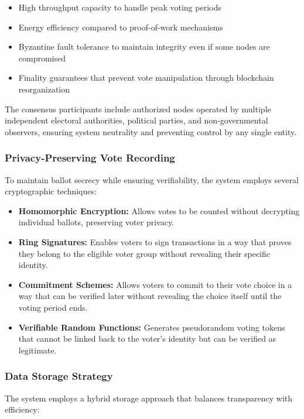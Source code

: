 \documentclass[conference]{IEEEtran}
\begin{document}
\begin{itemize}
    \item High throughput capacity to handle peak voting periods
    \item Energy efficiency compared to proof-of-work mechanisms
    \item Byzantine fault tolerance to maintain integrity even if some nodes are compromised
    \item Finality guarantees that prevent vote manipulation through blockchain reorganization
\end{itemize}

The consensus participants include authorized nodes operated by multiple independent electoral authorities, political parties, and non-governmental observers, ensuring system neutrality and preventing control by any single entity.

\subsubsection{Privacy-Preserving Vote Recording}
To maintain ballot secrecy while ensuring verifiability, the system employs several cryptographic techniques:

\begin{itemize}
    \item \textbf{Homomorphic Encryption:} Allows votes to be counted without decrypting individual ballots, preserving voter privacy.
    
    \item \textbf{Ring Signatures:} Enables voters to sign transactions in a way that proves they belong to the eligible voter group without revealing their specific identity.
    
    \item \textbf{Commitment Schemes:} Allows voters to commit to their vote choice in a way that can be verified later without revealing the choice itself until the voting period ends.
    
    \item \textbf{Verifiable Random Functions:} Generates pseudorandom voting tokens that cannot be linked back to the voter's identity but can be verified as legitimate.
\end{itemize}

\subsubsection{Data Storage Strategy}
The system employs a hybrid storage approach that balances transparency with efficiency:
\end{document}
